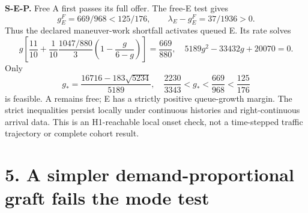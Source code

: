 \documentclass[11pt,a4paper]{article}
\begin{document}
\textbf{S-E-P.} Free A first passes its full offer. The free-E test gives
\begin{equation}
 g_E^{F}=669/968<125/176,\qquad
 \lambda_E-g_E^{F}=37/1936>0. \tag{14}
\end{equation}
Thus the declared maneuver-work shortfall activates queued E. Its rate solves
\begin{equation}
 g\left[\frac{11}{10}+\frac1{10}\frac{1047/880}{3}
                  \left(1-\frac{g}{6-g}\right)\right]=\frac{669}{880},
 \quad 5189g^2-33432g+20070=0. \tag{15}
\end{equation}
Only
\begin{equation}
 g_* =\frac{16716-183\sqrt{5234}}{5189},\quad
 \frac{2230}{3343}<g_*<\frac{669}{968}<\frac{125}{176} \tag{16}
\end{equation}
is feasible. A remains free; E has a strictly positive queue-growth margin.
The strict inequalities persist locally under continuous histories and
right-continuous arrival data. This is an H1-reachable local onset check,
not a time-stepped traffic trajectory or complete cohort result.

\newpage
\section*{5. A simpler demand-proportional graft fails the mode test}
\end{document}
